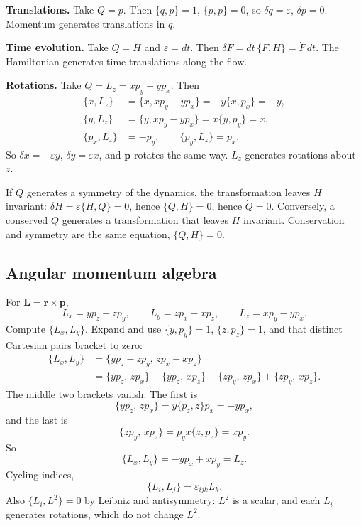 \documentclass[11pt]{article}
\numberwithin{equation}{section}
\newcommand{\vect}[1]{\mathbf{#1}}
\begin{document}
\textbf{Translations.} Take $Q=p$. Then $\{q,p\}=1$, $\{p,p\}=0$, so $\delta q=\varepsilon$, $\delta p=0$. Momentum generates translations in $q$.

\textbf{Time evolution.} Take $Q=H$ and $\varepsilon=dt$. Then $\delta F=dt\,\{F,H\}=\dot F\,dt$. The Hamiltonian generates time translations along the flow.

\textbf{Rotations.} Take $Q=L_z=x p_y-y p_x$. Then
\begin{align*}
\{x,L_z\} &= \{x, x p_y - y p_x\} = -y\{x,p_x\} = -y,\\
\{y,L_z\} &= \{y, x p_y - y p_x\} = x\{y,p_y\} = x,\\
\{p_x,L_z\} &= -p_y,\qquad \{p_y,L_z\}=p_x.
\end{align*}
So $\delta x=-\varepsilon y$, $\delta y=\varepsilon x$, and $\vect{p}$ rotates the same way. $L_z$ generates rotations about $z$.

If $Q$ generates a symmetry of the dynamics, the transformation leaves $H$ invariant: $\delta H=\varepsilon\{H,Q\}=0$, hence $\{Q,H\}=0$, hence $\dot Q=0$. Conversely, a conserved $Q$ generates a transformation that leaves $H$ invariant. Conservation and symmetry are the same equation, $\{Q,H\}=0$.

\subsection{Angular momentum algebra}

For $\vect{L}=\vect{r}\times\vect{p}$,
\[
L_x = y p_z - z p_y,\qquad
L_y = z p_x - x p_z,\qquad
L_z = x p_y - y p_x.
\]
Compute $\{L_x,L_y\}$. Expand and use $\{y,p_y\}=1$, $\{z,p_z\}=1$, and that distinct Cartesian pairs bracket to zero:
\begin{align*}
\{L_x,L_y\}
&= \{y p_z - z p_y,\, z p_x - x p_z\}\\
&= \{y p_z,\, z p_x\} - \{y p_z,\, x p_z\}
- \{z p_y,\, z p_x\} + \{z p_y,\, x p_z\}.
\end{align*}
The middle two brackets vanish. The first is
\[
\{y p_z,\, z p_x\} = y\{p_z,z\}p_x = -y p_x,
\]
and the last is
\[
\{z p_y,\, x p_z\} = p_y x\{z,p_z\} = x p_y.
\]
So
\[
\{L_x,L_y\} = -y p_x + x p_y = L_z.
\]
Cycling indices,
\begin{equation}
\label{eq:Lalg}
\{L_i,L_j\} = \varepsilon_{ijk} L_k.
\end{equation}
Also $\{L_i,L^2\}=0$ by Leibniz and antisymmetry: $L^2$ is a scalar, and each $L_i$ generates rotations, which do not change $L^2$.
\end{document}
